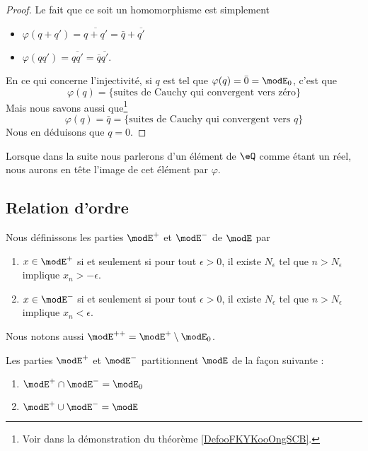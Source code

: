 \begin{proof}
    Le fait que ce soit un homomorphisme est simplement 
    \begin{itemize}
        \item \( \varphi(q+q')=\overline{ q+q' }=\bar q+\overline{ q' }\)
        \item \( \varphi(qq')=\overline{ qq' }=\overline{ q }\overline{ q' }\).
    \end{itemize}
    En ce qui concerne l'injectivité, si \( q\) est tel que \( \varphi(q)=\bar 0=\modE_0\), c'est que
    \begin{equation}
        \varphi(q)=\{ \text{suites de Cauchy qui convergent vers zéro} \}
    \end{equation}
    Mais nous savons aussi que\footnote{Voir dans la démonstration du théorème \ref{DefooFKYKooOngSCB}.}
    \begin{equation}
        \varphi(q)=\bar q=\{ \text{suites de Cauchy qui convergent vers } q \}
    \end{equation}
    Nous en déduisons que \( q=0\).
\end{proof}
Lorsque dans la suite nous parlerons d'un élément de \( \eQ\) comme étant un réel, nous aurons en tête l'image de cet élément par \( \varphi\).

\subsection{Relation d'ordre}

Nous définissons les parties \( \modE^+\) et \( \modE^-\) de \( \modE\) par
\begin{enumerate}
    \item
        \( x\in  \modE^+\) si et seulement si pour tout \( \epsilon>0\), il existe \( N_{\epsilon}\) tel que \( n>N_{\epsilon}\) implique \( x_n>-\epsilon\).
    \item
        \( x\in  \modE^-\) si et seulement si pour tout \( \epsilon>0\), il existe \( N_{\epsilon}\) tel que \( n>N_{\epsilon}\) implique \( x_n<\epsilon\).
\end{enumerate}
Nous notons aussi \( \modE^{++}=\modE^+\setminus\modE_0\).

\begin{lemma}
    Les parties \( \modE^+\) et \( \modE^-\) partitionnent \( \modE\) de la façon suivante :
    \begin{enumerate}
        \item
            \( \modE^+\cap\modE^-=\modE_0\)
        \item
            \( \modE^+\cup\modE^-=\modE\)
    \end{enumerate}
\end{lemma}

